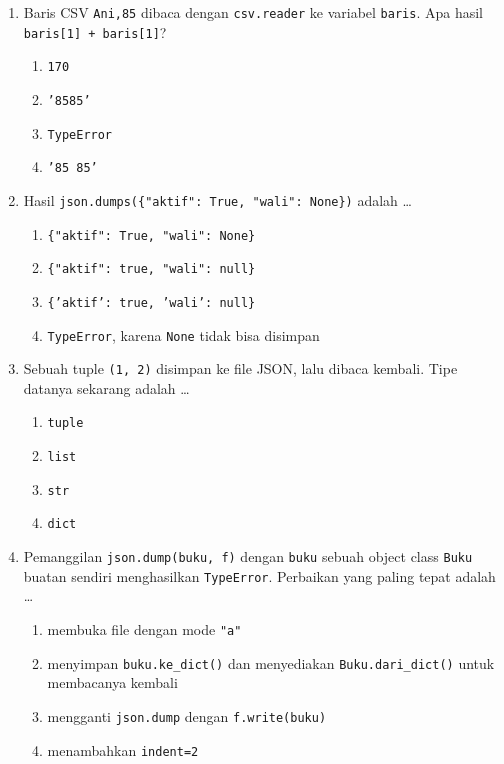 \begin{enumerate}
  \item Baris CSV \texttt{Ani,85} dibaca dengan \texttt{csv.reader} ke variabel \texttt{baris}. Apa hasil \texttt{baris[1] + baris[1]}?
  \begin{enumerate}[label=\alph*.,itemsep=0pt]
    \item \texttt{170}
    \item \texttt{'8585'}
    \item \texttt{TypeError}
    \item \texttt{'85 85'}
  \end{enumerate}

  \item Hasil \texttt{json.dumps(\{"aktif": True, "wali": None\})} adalah \ldots
  \begin{enumerate}[label=\alph*.,itemsep=0pt]
    \item \texttt{\{"aktif": True, "wali": None\}}
    \item \texttt{\{"aktif": true, "wali": null\}}
    \item \texttt{\{'aktif': true, 'wali': null\}}
    \item \texttt{TypeError}, karena \texttt{None} tidak bisa disimpan
  \end{enumerate}

  \item Sebuah tuple \texttt{(1, 2)} disimpan ke file JSON, lalu dibaca kembali. Tipe datanya sekarang adalah \ldots
  \begin{enumerate}[label=\alph*.,itemsep=0pt]
    \item \texttt{tuple}
    \item \texttt{list}
    \item \texttt{str}
    \item \texttt{dict}
  \end{enumerate}

  \item Pemanggilan \texttt{json.dump(buku, f)} dengan \texttt{buku} sebuah object class \texttt{Buku} buatan sendiri menghasilkan \texttt{TypeError}. Perbaikan yang paling tepat adalah \ldots
  \begin{enumerate}[label=\alph*.,itemsep=0pt]
    \item membuka file dengan mode \texttt{"a"}
    \item menyimpan \texttt{buku.ke\_dict()} dan menyediakan \texttt{Buku.dari\_dict()} untuk membacanya kembali
    \item mengganti \texttt{json.dump} dengan \texttt{f.write(buku)}
    \item menambahkan \texttt{indent=2}
  \end{enumerate}


\end{enumerate}
